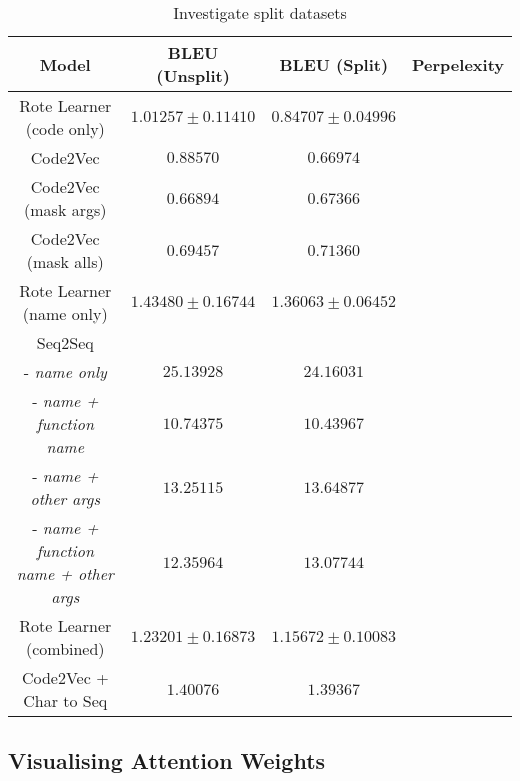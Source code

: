 \begin{table}[!ht]
\begin{center}
\begin{tabular}{ c | c | c | c }
    Model                             & BLEU (Unsplit)  & BLEU (Split)    & Perpelexity \\
    \hline
    Rote Learner  (code only)         & $ 1.01257 \pm  0.11410 $ & $ 0.84707 \pm 0.04996 $ & \\
    Code2Vec                          & $ 0.88570 $ & $ 0.66974 $ & \\
    Code2Vec  (mask args)             & $ 0.66894 $ & $ 0.67366 $ & \\
    Code2Vec  (mask alls)             & $ 0.69457 $ & $ 0.71360 $ & \\
    \hline
    \hline
    Rote Learner  (name only)         & $ 1.43480 \pm  0.16744 $ & $ 1.36063 \pm 0.06452 $ & \\
    \hline
    Seq2Seq                             & &  & \\
    - \textit{name only}               & $ 25.13928 $ & $ 24.16031 $ & \\
    - \textit{name + function name}     & $ 10.74375 $ & $ 10.43967 $ & \\
    - \textit{name + other args}        & $ 13.25115 $ & $ 13.64877 $ & \\
    - \textit{name + function name + other args}    & $ 12.35964 $ & $ 13.07744 $ &  \\
    \hline
    \hline
    Rote Learner (combined)            & $ 1.23201 \pm  0.16873 $ & $ 1.15672 \pm 0.10083 $ & \\
    Code2Vec  + Char to Seq            & $ 1.40076 $ & $ 1.39367 $ & \\
    \hline
\end{tabular}
\caption {Investigate split datasets}
\label{table:split_datasets_embed}
\end{center}
\end{table}


\subsection{Visualising Attention Weights} %
\label{sub:visualising_attention_weights}

